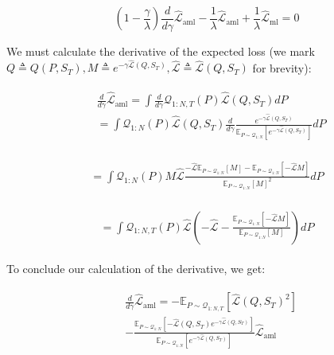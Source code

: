 \documentclass[letterpaper]{article} %
\theoremstyle{definition}
\newcommand{\Expect}[2]{\mathbb{E}_{#1}\left [#2 \right ]}
\begin{document}
\begin{equation} \label{eq:gamma-deriv}
(1-\frac{\gamma}{\lambda})\frac{d}{d\gamma}\hat{\mathcal{L}}_{\mathrm{aml}} -\frac{1}{\lambda}\hat{\mathcal{L}}_{\mathrm{aml}} +\frac{1}{\lambda}\hat{\mathcal{L}}_{\mathrm{ml}} =0
\end{equation}

We must calculate the derivative of the expected loss (we mark $Q\triangleq Q(P,S_T), M\triangleq e^{-\gamma\hat{\mathcal{L}}(Q,S_T)},\hat{\mathcal{L}}\triangleq \hat{\mathcal{L}}(Q,S_T)$ for brevity): 

\begin{align*}
\begin{split}
&\frac{d}{d\gamma}\hat{\mathcal{L}}_{\mathrm{aml}}=\int \frac{d}{d\gamma}\mathcal{Q}_{1:N,T}(P)\hat{\mathcal{L}}(Q, S_T)dP\\
&=\int \mathcal{Q}_{1:N}(P)\hat{\mathcal{L}}(Q, S_T)\frac{d}{d\gamma}
\frac{e^{-\gamma\hat{\mathcal{L}}(Q,S_T)}}{\Expect{P\sim \mathcal{Q}_{1:N}}{e^{-\gamma\hat{\mathcal{L}}(Q,S_T)}}}dP
\end{split}
\end{align*}

\begin{align*}
\begin{split}
=\int \mathcal{Q}_{1:N}(P)M\hat{\mathcal{L}}\frac{-\hat{\mathcal{L}}\Expect{P\sim \mathcal{Q}_{1:N}}{M}
	-\Expect{P\sim \mathcal{Q}_{1:N}}{-\hat{\mathcal{L}}M}}{\Expect{P\sim \mathcal{Q}_{1:N}}{M}^2}dP
\end{split}
\end{align*}

\begin{align*}
\begin{split}
=\int \mathcal{Q}_{1:N,T}(P)\hat{\mathcal{L}}\left (-\hat{\mathcal{L}}-
\frac{\Expect{P\sim \mathcal{Q}_{1:N}}{-\hat{\mathcal{L}}M }}{\Expect{P\sim \mathcal{Q}_{1:N}}{M}}\right)dP
\end{split}
\end{align*}

To conclude our calculation of the derivative, we get:

\begin{align*}
\begin{split}
&\frac{d}{d\gamma}\hat{\mathcal{L}}_{\mathrm{aml}}
=-\Expect{P\sim \mathcal{Q}_{1:N,T}}{\hat{\mathcal{L}}(Q,S_T)^2}\\&-\frac{\Expect{P\sim \mathcal{Q}_{1:N}}{-\hat{\mathcal{L}}(Q,S_T)e^{-\gamma\hat{\mathcal{L}}(Q,S_T)} }}{\Expect{P\sim \mathcal{Q}_{1:N}}{e^{-\gamma\hat{\mathcal{L}}(Q,S_T)}} }\hat{\mathcal{L}}_{\mathrm{aml}}
\end{split}
\end{align*}
\end{document}

